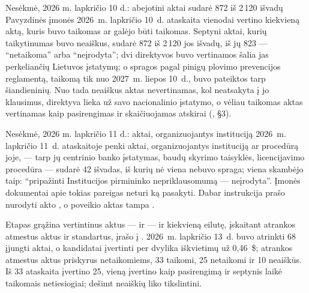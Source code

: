 \begin{lessonbox}{Nesėkmė, 2026 m. lapkričio 10 d.: abejotini aktai sudarė 872 iš 2\,120 išvadų}
Pavyzdinės įmonės 2026~m. lapkričio 10~d. ataskaita vienodai vertino kiekvieną aktą, kuris buvo
taikomas ar galėjo būti taikomas. Septyni aktai, kurių taikytinumas buvo neaiškus, sudarė 872 iš
2\,120 jos išvadų, iš jų 823 --- \enquote{netaikoma} arba \enquote{neįrodyta}; dvi direktyvos
buvo vertinamos šalia jas perkeliančių Lietuvos įstatymų; o spragos pagal pinigų plovimo
prevencijos reglamentą, taikomą tik nuo 2027~m. liepos 10~d., buvo pateiktos tarp šiandieninių.
Nuo tada neaiškus aktas nevertinamas, kol neatsakyta į jo klausimus, direktyva lieka už savo
nacionalinio įstatymo, o vėliau taikomas aktas vertinamas kaip pasirengimas ir skaičiuojamas
atskirai (, §3).
\end{lessonbox}

\begin{lessonbox}{Nesėkmė, 2026 m. lapkričio 11 d.: aktai, organizuojantys instituciją}
2026~m. lapkričio 11~d. ataskaitoje penki aktai, organizuojantys instituciją ar procedūrą joje,
--- tarp jų centrinio banko įstatymas, baudų skyrimo taisyklės, licencijavimo procedūra ---
sudarė 42 išvadas, iš kurių nė viena nebuvo spraga; viena skambėjo taip: \enquote{pripažinti
Institucijos pirmininko nepriklausomumą --- neįrodyta}. Įmonės dokumentai apie tokias pareigas
neturi ką pasakyti. Dabar instrukcija prašo nurodyti akto , o  poveikio
aktas tampa .
\end{lessonbox}

Etapas grąžina vertintinus aktus ---  ir  --- ir kiekvieną eilutę,
įskaitant atrankos atmestus aktus ir standartus, įrašo į . 2026~m. lapkričio
13~d. buvo atrinkti 68 įjungti aktai, o kandidatai įvertinti per dvylika iškvietimų už 0,46~\$;
atrankos atmestus aktus priskyrus netaikomiems, 33 taikomi, 25 netaikomi ir 10 neaiškūs. Iš 33
ataskaita įvertino 25, vieną įvertino kaip pasirengimą ir septynis laikė taikomais
netiesiogiai; dešimt neaiškių liko tikslintini.

